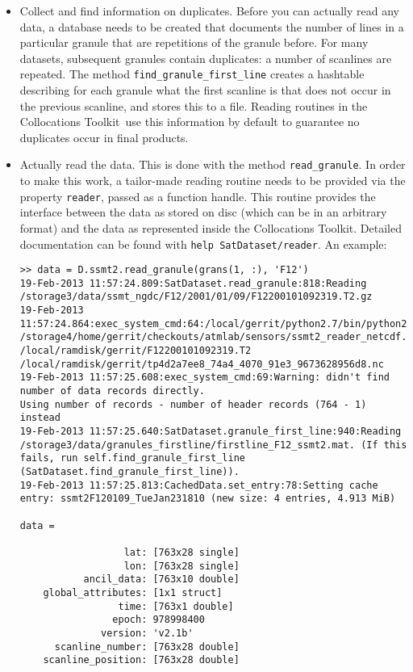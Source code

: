 \documentclass[a4paper,10pt]{article}
\newcommand{\collocs}{Collocations Toolkit}
\begin{document}
\begin{itemize}
\begin{lstlisting}
\end{lstlisting}
\item Collect and find information on duplicates.
Before you can actually read any data, a database needs to be created that
documents the number of lines in a particular granule that are repetitions
of the granule before.
For many datasets, subsequent granules contain duplicates: a number of
scanlines are repeated.
The method \lstinline|find_granule_first_line| creates a hashtable describing
for each granule what the first scanline is that does not occur in the
previous scanline, and stores this to a file.
Reading routines in the \collocs\ use this information by default to guarantee
no duplicates occur in final products.
\item Actually read the data.
This is done with the method \lstinline|read_granule|.
In order to make this work, a tailor-made reading routine needs to be provided
via the property \lstinline|reader|, passed as a function handle.
This routine provides the interface between the data as stored on disc (which
can be in an arbitrary format) and the data as represented inside the
\collocs.
Detailed documentation can be found with \lstinline|help SatDataset/reader|.
An example:
\begin{lstlisting}
>> data = D.ssmt2.read_granule(grans(1, :), 'F12')
19-Feb-2013 11:57:24.809:SatDataset.read_granule:818:Reading /storage3/data/ssmt_ngdc/F12/2001/01/09/F12200101092319.T2.gz
19-Feb-2013 11:57:24.864:exec_system_cmd:64:/local/gerrit/python2.7/bin/python2.7 /storage4/home/gerrit/checkouts/atmlab/sensors/ssmt2_reader_netcdf.py /local/ramdisk/gerrit/F12200101092319.T2 /local/ramdisk/gerrit/tp4d2a7ee8_74a4_4070_91e3_9673628956d8.nc
19-Feb-2013 11:57:25.608:exec_system_cmd:69:Warning: didn't find number of data records directly.
Using number of records - number of header records (764 - 1) instead
19-Feb-2013 11:57:25.640:SatDataset.granule_first_line:940:Reading /storage3/data/granules_firstline/firstline_F12_ssmt2.mat. (If this fails, run self.find_granule_first_line (SatDataset.find_granule_first_line)).
19-Feb-2013 11:57:25.813:CachedData.set_entry:78:Setting cache entry: ssmt2F120109_TueJan231810 (new size: 4 entries, 4.913 MiB)

data = 

                  lat: [763x28 single]
                  lon: [763x28 single]
           ancil_data: [763x10 double]
    global_attributes: [1x1 struct]
                 time: [763x1 double]
                epoch: 978998400
              version: 'v2.1b'
      scanline_number: [763x28 double]
    scanline_position: [763x28 double]
\end{lstlisting}
\end{itemize}
\end{document}
